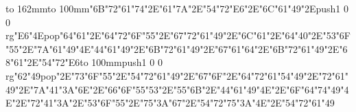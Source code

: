 \hbox to 162mm{\hsize=69mm\vbox to 100mm{\vfill\ipa\char"6B\ipa\char"72\ipa\char"61\ipa\char"74\ipa\char"2E\ipa\char"61\ipa\char"7A\ipa\char"2E\ipa\char"54\ipa\char"72\ipa\char"E6\ipa\char"2E\ipa\char"6C\ipa\char"61\ipa\char"49\ipa\char"2E\pdfcolorstack\match push{1 0 0 rg}\ipa\char"E6\ipa\char"4E\pdfcolorstack\match pop{}\medskip\ipa\char"64\ipa\char"61\ipa\char"2E\ipa\char"64\ipa\char"72\ipa\char"6F\ipa\char"55\ipa\char"2E\ipa\char"67\ipa\char"72\ipa\char"61\ipa\char"49\ipa\char"2E\ipa\char"6C\ipa\char"61\ipa\char"2E\ipa\char"64\ipa\char"40\ipa\char"2E\ipa\char"53\ipa\char"6F\ipa\char"55\ipa\char"2E\ipa\char"7A\ipa\char"61\ipa\char"49\ipa\char"4E\medskip\ipa\char"44\ipa\char"61\ipa\char"49\ipa\char"2E\ipa\char"6B\ipa\char"72\ipa\char"61\ipa\char"49\ipa\char"2E\ipa\char"67\ipa\char"61\ipa\char"64\ipa\char"2E\ipa\char"6B\ipa\char"72\ipa\char"61\ipa\char"49\ipa\char"2E\ipa\char"68\ipa\char"61\ipa\char"2E\ipa\char"54\ipa\char"72\ipa\char"E6\vfill}\hfill\vbox to 100mm{\vfill\pdfcolorstack\match push{1 0 0 rg}\ipa\char"62\ipa\char"49\pdfcolorstack\match pop{}\ipa\char"2E\ipa\char"73\ipa\char"6F\ipa\char"55\ipa\char"2E\ipa\char"54\ipa\char"72\ipa\char"61\ipa\char"49\ipa\char"2E\ipa\char"67\ipa\char"6F\ipa\char"2E\ipa\char"64\ipa\char"72\ipa\char"61\medskip\ipa\char"54\ipa\char"49\ipa\char"2E\ipa\char"72\ipa\char"61\ipa\char"49\ipa\char"2E\ipa\char"7A\ipa\char"41\ipa\char"3A\ipa\char"6E\ipa\char"2E\ipa\char"66\ipa\char"6F\ipa\char"55\ipa\char"53\ipa\char"2E\ipa\char"55\ipa\char"6B\ipa\char"2E\ipa\char"44\ipa\char"61\ipa\char"49\ipa\char"4E\ipa\char"2E\ipa\char"6F\ipa\char"64\medskip\ipa\char"74\ipa\char"49\ipa\char"4E\ipa\char"2E\ipa\char"72\ipa\char"41\ipa\char"3A\ipa\char"2E\ipa\char"53\ipa\char"6F\ipa\char"55\ipa\char"2E\ipa\char"75\ipa\char"3A\ipa\char"67\ipa\char"2E\ipa\char"54\ipa\char"72\ipa\char"75\ipa\char"3A\ipa\char"4E\ipa\char"2E\ipa\char"54\ipa\char"72\ipa\char"61\ipa\char"49\vfill}}\eject
